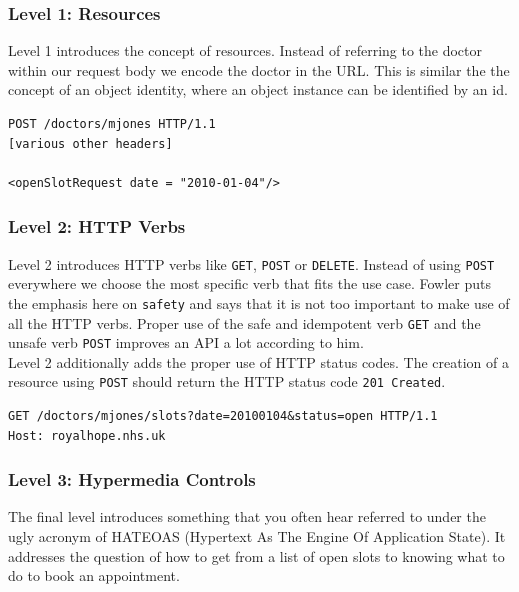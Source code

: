 \subsubsection{Level 1: Resources}
Level 1 introduces the concept of resources. Instead of referring to the doctor within our request body we encode the doctor in the URL. This is similar the the concept of an object identity, where an object instance can be identified by an id.

\lstset{language=XML}
\begin{lstlisting}[caption=Level 1: Referring to the doctor as a resource.]
POST /doctors/mjones HTTP/1.1
[various other headers]

<openSlotRequest date = "2010-01-04"/>
\end{lstlisting}

\subsubsection{Level 2: HTTP Verbs}
Level 2 introduces HTTP verbs like \lstinline{GET}, \lstinline{POST} or \lstinline{DELETE}. Instead of using \lstinline{POST} everywhere we choose the most specific verb that fits the use case.
Fowler puts the emphasis here on \lstinline{safety} and says that it is not too important to make use of all the HTTP verbs. Proper use of the safe and idempotent verb \lstinline{GET} and the unsafe verb \lstinline{POST} improves an API a lot according to him. \\
Level 2 additionally adds the proper use of HTTP status codes. The creation of a resource using \lstinline{POST} should return the HTTP status code \lstinline{201 Created}.

\lstset{language=}
\begin{lstlisting}[caption=Level 2: Safely fetching the list of open slots using \lstinline{GET}.]
GET /doctors/mjones/slots?date=20100104&status=open HTTP/1.1
Host: royalhope.nhs.uk
\end{lstlisting}

\subsubsection{Level 3: Hypermedia Controls}
The final level introduces something that you often hear referred to under the ugly acronym of HATEOAS (Hypertext As The Engine Of Application State). It addresses the question of how to get from a list of open slots to knowing what to do to book an appointment. \citep{richardsonmaturitymodel}

